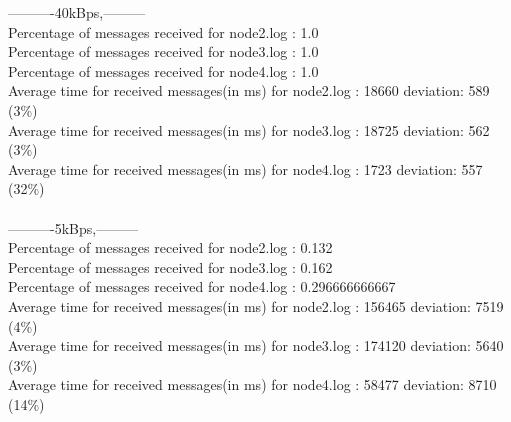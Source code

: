         ----------40kBps,---------\\
        Percentage of messages received for node2.log : 1.0\\
        Percentage of messages received for node3.log : 1.0\\
        Percentage of messages received for node4.log : 1.0\\
        Average time for received messages(in ms) for  node2.log : 18660    deviation: 589 (3\%)\\
        Average time for received messages(in ms) for  node3.log : 18725    deviation: 562 (3\%)\\
        Average time for received messages(in ms) for  node4.log : 1723     deviation: 557 (32\%)\\\\
        ----------5kBps,---------\\
        Percentage of messages received for node2.log : 0.132\\
        Percentage of messages received for node3.log : 0.162\\
        Percentage of messages received for node4.log : 0.296666666667\\
        Average time for received messages(in ms) for  node2.log : 156465   deviation: 7519 (4\%)\\
        Average time for received messages(in ms) for  node3.log : 174120   deviation: 5640 (3\%)\\
        Average time for received messages(in ms) for  node4.log : 58477    deviation: 8710 (14\%)\\\\
